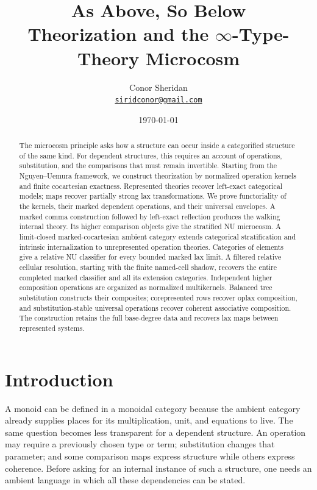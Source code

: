 \documentclass[oneside]{article}
\title{%
  As Above, So Below\\[0.5em]
  \normalfont\large Theorization and the $\infty$-Type-Theory Microcosm
}
\author{%
  Conor Sheridan\\
  \small\href{mailto:siridconor@gmail.com}{\texttt{siridconor@gmail.com}}%
}
\date{\today}
\theoremstyle{plain}
\theoremstyle{definition}
\theoremstyle{remark}
\begin{document}
\maketitle
\begin{abstract}
The microcosm principle asks how a structure can occur inside a categorified
structure of the same kind. For dependent structures, this requires an
account of operations, substitution, and the comparisons that must remain
invertible. Starting from the Nguyen--Uemura framework, we construct
theorization by normalized operation kernels and finite cocartesian
exactness. Represented theories recover left-exact categorical models;
maps recover partially strong lax transformations. We prove functoriality
of the kernels, their marked dependent operations, and their universal
envelopes. A marked comma construction followed by left-exact reflection
produces the walking internal theory. Its higher comparison objects give
 the stratified NU microcosm. A limit-closed marked-cocartesian ambient
 category extends categorical stratification and intrinsic internalization
 to unrepresented operation theories. Categories of elements give a relative
 NU classifier for every bounded marked lax limit. A filtered relative
 cellular resolution, starting with the finite named-cell shadow, recovers
 the entire completed marked classifier and all its extension categories.
 Independent higher composition operations are organized as normalized
 multikernels. Balanced tree substitution constructs their composites;
 corepresented rows recover oplax composition, and substitution-stable
 universal operations recover coherent associative composition. The
 construction retains the full base-degree data and recovers lax maps
 between represented systems.
\end{abstract}

\tableofcontents

\section{Introduction}\label{sec:introduction}

A monoid can be defined in a monoidal category because the ambient category
already supplies places for its multiplication, unit, and equations to
live. The same question becomes less transparent for a dependent
structure. An operation may require a previously chosen type or term;
substitution changes that parameter; and some comparison maps express
structure while others express coherence. Before asking for an internal
instance of such a structure, one needs an ambient language in which all
these dependencies can be stated.
\end{document}
